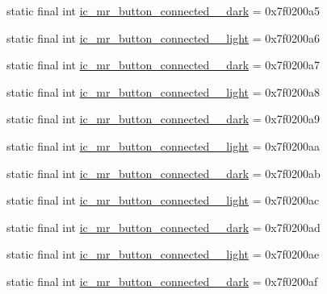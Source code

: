 \begin{CompactItemize}
\item 
static final int \hyperlink{classandroid_1_1support_1_1graphics_1_1drawable_1_1_r_1_1drawable_79c9fa367ccbc2ff4796431175fc7521}{ic\_\-mr\_\-button\_\-connected\_\_\-dark} = 0x7f0200a5
\item 
static final int \hyperlink{classandroid_1_1support_1_1graphics_1_1drawable_1_1_r_1_1drawable_0d5d5f241df2729235ca75beff769e6c}{ic\_\-mr\_\-button\_\-connected\_\_\-light} = 0x7f0200a6
\item 
static final int \hyperlink{classandroid_1_1support_1_1graphics_1_1drawable_1_1_r_1_1drawable_11b5ed0aae0c6b8a21f6171c76b7d2b9}{ic\_\-mr\_\-button\_\-connected\_\_\-dark} = 0x7f0200a7
\item 
static final int \hyperlink{classandroid_1_1support_1_1graphics_1_1drawable_1_1_r_1_1drawable_ec1a66c167c41bc381d8b724dbb68a1d}{ic\_\-mr\_\-button\_\-connected\_\_\-light} = 0x7f0200a8
\item 
static final int \hyperlink{classandroid_1_1support_1_1graphics_1_1drawable_1_1_r_1_1drawable_0b358d6a65de9e300b93c795c80fdcd3}{ic\_\-mr\_\-button\_\-connected\_\_\-dark} = 0x7f0200a9
\item 
static final int \hyperlink{classandroid_1_1support_1_1graphics_1_1drawable_1_1_r_1_1drawable_c3f0fe6f3cafd44f56f773ee104f2f88}{ic\_\-mr\_\-button\_\-connected\_\_\-light} = 0x7f0200aa
\item 
static final int \hyperlink{classandroid_1_1support_1_1graphics_1_1drawable_1_1_r_1_1drawable_9e43f484f263917e4004ffa3dcaf8800}{ic\_\-mr\_\-button\_\-connected\_\_\-dark} = 0x7f0200ab
\item 
static final int \hyperlink{classandroid_1_1support_1_1graphics_1_1drawable_1_1_r_1_1drawable_07e09ec66cebecba45da94fffe78ac0d}{ic\_\-mr\_\-button\_\-connected\_\_\-light} = 0x7f0200ac
\item 
static final int \hyperlink{classandroid_1_1support_1_1graphics_1_1drawable_1_1_r_1_1drawable_79cb9af352e35c823fcf253016963f34}{ic\_\-mr\_\-button\_\-connected\_\_\-dark} = 0x7f0200ad
\item 
static final int \hyperlink{classandroid_1_1support_1_1graphics_1_1drawable_1_1_r_1_1drawable_66f9e3a16cf649e790bae1bc44c22bd8}{ic\_\-mr\_\-button\_\-connected\_\_\-light} = 0x7f0200ae
\item 
static final int \hyperlink{classandroid_1_1support_1_1graphics_1_1drawable_1_1_r_1_1drawable_2949c9accee4c861e60bdc7e7394b108}{ic\_\-mr\_\-button\_\-connected\_\_\-dark} = 0x7f0200af
\item 

\end{CompactItemize}

